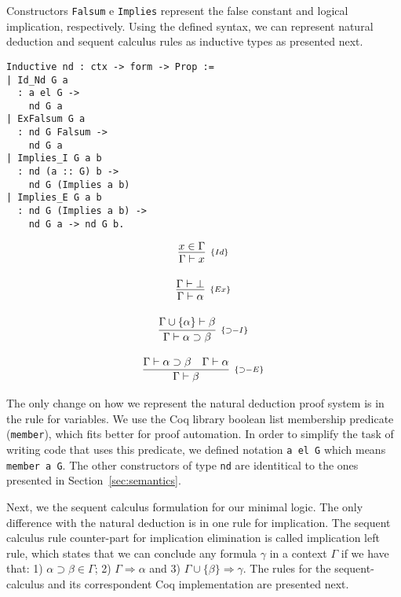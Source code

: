 \documentclass[12pt]{article}
\theoremstyle{definition}
\begin{document}
Constructors \lstinline{Falsum} e \lstinline{Implies} represent the
false constant and logical implication, respectively. Using the defined
syntax, we can represent natural deduction and sequent calculus rules as
inductive types as presented next.

\begin{minipage}[c]{0.6\textwidth}
\begin{lstlisting}
Inductive nd : ctx -> form -> Prop :=
| Id_Nd G a
  : a el G ->
    nd G a
| ExFalsum G a
  : nd G Falsum ->
    nd G a
| Implies_I G a b
  : nd (a :: G) b ->
    nd G (Implies a b)
| Implies_E G a b
  : nd G (Implies a b) ->
    nd G a -> nd G b.
\end{lstlisting}
\end{minipage}
\begin{minipage}[c]{0.3\textwidth}
\[
\begin{array}{c}
\infer[_{\{Id\}}]{\Gamma \vdash x}{x \in \Gamma} \\ \\
\infer[_{\{Ex\}}]{\Gamma \vdash \alpha}{\Gamma \vdash \bot}\\ \\
\infer[_{\{\supset-I\}}]{\Gamma \vdash \alpha \supset \beta}{\Gamma \cup \{\alpha\} \vdash \beta}\\ \\
\infer[_{\{\supset-E\}}]{\Gamma \vdash \beta}{\Gamma \vdash \alpha \supset \beta & \Gamma \vdash \alpha}
\end{array}
\]
\end{minipage}

The only change on how we represent the natural deduction proof system is in the
rule for variables. We use the Coq library boolean list membership predicate
(\lstinline{member}), which fits better for proof automation. In order to
simplify the task of writing code that uses this predicate, we defined
notation \lstinline{a el G} which means \lstinline{member a G}. The other
constructors of type \lstinline{nd} are identitical to the ones presented in
Section~\ref{sec:semantics}.

Next, we the sequent calculus formulation for our minimal logic. The only
difference with the natural deduction is in one rule for implication. The
sequent calculus rule counter-part for implication elimination is called
implication left rule, which states that we can conclude any formula $\gamma$
in a context $\Gamma$ if we have that: 1) $\alpha \supset \beta \in \Gamma$;
2) $\Gamma \Rightarrow \alpha$ and 3) $\Gamma \cup \{\beta\} \Rightarrow
\gamma$. The rules for the sequent-calculus and its correspondent Coq
implementation are presented next.
\end{document}

